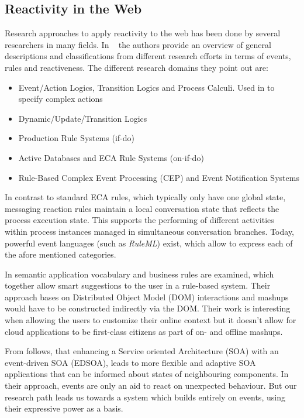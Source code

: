 \documentclass[11pt]{article}%
\begin{document}
\subsection{Reactivity in the Web}
Research approaches to apply reactivity to the web has been done by several researchers in many fields.
In ~\cite{2009-Paschke_Boley-RCER.pdf} the authors provide an overview of general descriptions and classifications from different research efforts in terms of events, rules and reactiveness. The different research domains they point out are:
 \begin{itemize}
  \item Event/Action Logics, Transition Logics and Process Calculi. Used in \cite{Behrends:2008:EEA:1377798.1377801} to specify complex actions
  \item Dynamic/Update/Transition Logics
  \item Production Rule Systems (if-do)
  \item Active Databases and ECA Rule Systems (on-if-do)
  \item Rule-Based Complex Event Processing (CEP) and Event Notification Systems
\end{itemize}
In contrast to standard ECA rules, which typically only have one global state, messaging reaction rules maintain a local conversation state that reflects the process execution state. This supports the performing of different activities within process instances managed in simultaneous conversation branches. Today, powerful event languages (such as \emph{RuleML}) exist, which allow to express each of the afore mentioned categories.

In \cite{2012-Giurca_etal-RuleTheWeb.pdf} semantic application vocabulary and business rules are examined, which together allow smart suggestions to the user in a rule-based system. Their approach bases on Distributed Object Model (DOM) interactions and mashups would have to be constructed indirectly via the DOM. Their work is interesting when allowing the users to customize their online context but it doesn't allow for cloud applications to be first-class citizens as part of on- and offline mashups.

From \cite{2010-Ye_Jacobsen-EEWS.pdf} follows, that enhancing a Service oriented Architecture (SOA) with an event-driven SOA (EDSOA), leads to more flexible and adaptive SOA applications that can be informed about states of neighbouring components. In their approach, events are only an aid to react on unexpected behaviour. But our research path leads us towards a system which builds entirely on events, using their expressive power as a basis.
\end{document}
